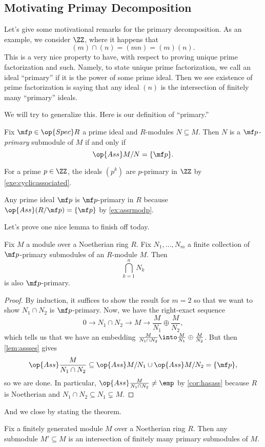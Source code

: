 \subsection{Motivating Primay Decomposition}
Let's give some motivational remarks for the primary decomposition. As an example, we consider $\ZZ$, where it happens that
\[(m)\cap(n)=(mn)=(m)(n).\]
This is a very nice property to have, with respect to proving unique prime factorization and such. Namely, to state unique prime factorization, we call an ideal ``primary'' if it is the power of some prime ideal. Then we see existence of prime factorization is saying that any ideal $(n)$ is the intersection of finitely many ``primary'' ideals.

We will try to generalize this. Here is our definition of ``primary.''
\begin{definition}
	Fix $\mf p\in\op{Spec}R$ a prime ideal and $R$-modules $N\subseteq M$. Then $N$ is a \textit{$\mf p$-primary} submodule of $M$ if and only if
	\[\op{Ass}M/N=\{\mf p\}.\]
\end{definition}
\begin{example}
	For a prime $p\in\ZZ$, the ideals $\left(p^k\right)$ are $p$-primary in $\ZZ$ by \autoref{exe:cyclicassociated}.
\end{example}
\begin{example}
	Any prime ideal $\mf p$ is $\mf p$-primary in $R$ because $\op{Ass}(R/\mf p)=\{\mf p\}$ by \autoref{ex:assrmodp}.
\end{example}
Let's prove one nice lemma to finish off today.
\begin{lemma} \label{lem:intersectprimary}
	Fix $M$ a module over a Noetherian ring $R$. Fix $N_1,\ldots,N_m$ a finite collection of $\mf p$-primary submodules of an $R$-module $M$. Then
	\[\bigcap_{k=1}^nN_k\]
	is also $\mf p$-primary.
\end{lemma}
\begin{proof}
	By induction, it suffices to show the result for $m=2$ so that we want to show $N_1\cap N_2$ is $\mf p$-primary. Now, we have the right-exact sequence
	\[0\to N_1\cap N_2\to M\to\frac M{N_1}\oplus\frac M{N_2},\]
	which tells us that we have an embedding $\frac M{N_1\cap N_2}\into\frac M{N_1}\oplus\frac M{N_2}$. But then \autoref{lem:assses} gives
	\[\op{Ass}\frac M{N_1\cap N_2}\subseteq\op{Ass}M/N_1\cup\op{Ass}M/N_2=\{\mf p\},\]
	so we are done. In particular, $\op{Ass}\frac M{N_1\cap N_2}\ne\emp$ by \autoref{cor:hasass} because $R$ is Noetherian and $N_1\cap N_2\subseteq N_1\subsetneq M$.
\end{proof}
And we close by stating the theorem.
\begin{theorem}
	Fix a finitely generated module $M$ over a Noetherian ring $R$. Then any submodule $M'\subseteq M$ is an intersection of finitely many primary submodules of $M$.
\end{theorem}